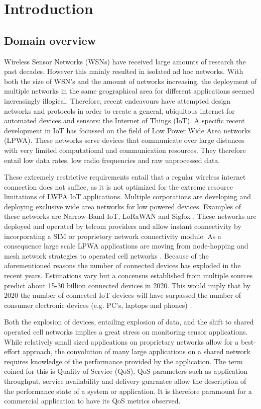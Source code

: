 \chapter{Introduction}

\section{Domain overview} 
Wireless Sensor Networks (WSNs) have received large amounts of research the past decades. However this mainly resulted in isolated ad hoc networks. With both the size of WSN's and the amount of networks increasing, the deployment of multiple networks in the same geographical area for different applications seemed increasingly illogical. Therefore, recent endeavours have attempted design networks and protocols in order to create a general, ubiquitous internet for automated devices and sensors: the Internet of Things (IoT). A specific recent development in IoT has focussed on the field of Low Power Wide Area networks (LPWA). These networks serve devices that communicate over large distances with very limited computational and communication resources. They therefore entail low data rates, low radio frequencies and raw unprocessed data. 

These extremely restrictive requirements entail that a regular wireless internet connection does not suffice, as it is not optimized for the extreme resource limitations of LWPA IoT applications. Multiple corporations are developing and deploying exclusive wide area networks for low powered devices. Examples of these networks are Narrow-Band IoT\cite{web:nbiot}, LoRaWAN \cite{web:lora} and Sigfox \cite{web:sigfox}. These networks are deployed and operated by telcom providers and allow instant connectivity by incorporating a SIM or proprietory network connectivity module. As a consequence large scale LPWA applications are moving from node-hopping and mesh network strategies to operated cell networks \cite{needs source}. Because of the aforementioned reasons the number of connected devices has exploded in the recent years. Estimations vary but a concensus established from multiple sources predict about 15-30 billion connected devices in 2020. This would imply that by 2020 the number of connected IoT devices will have surpassed the number of consumer electronic devices (e.g. PC's, laptops and phones) \cite{ericson}. 

Both the explosion of devices, entailing explosion of data, and the shift to shared operated cell networks implies a great stress on monitoring sensor applications. While relatively small sized applications on proprietary networks allow for a best-effort approach, the convolution of many large applications on a shared network requires knowledge of the performance provided by the application. The term coined for this is Quality of Service (QoS). QoS parameters such as application throughput, service availability and delivery guarantee allow the description of the performance state of a system or application. It is therefore paramount for a commercial application to have its QoS metrics observed. 

